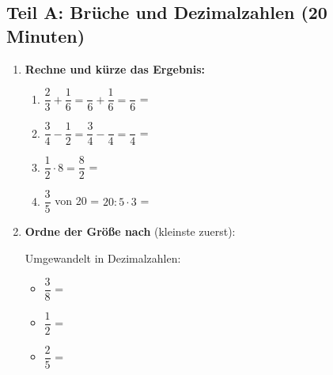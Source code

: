 \subsection*{Teil A: Brüche und Dezimalzahlen (20 Minuten)}

\begin{enumerate}[label=\arabic*.]
    \item \textbf{Rechne und kürze das Ergebnis:}

    \begin{enumerate}[label=\alph*)]
        \item $\dfrac{2}{3} + \dfrac{1}{6} = \dfrac{\phantom{4}}{6} + \dfrac{1}{6} = \dfrac{\phantom{5}}{6}$ = \underline{\hspace{3cm}}

        \item $\dfrac{3}{4} - \dfrac{1}{2} = \dfrac{3}{4} - \dfrac{\phantom{2}}{4} = \dfrac{\phantom{1}}{4}$ = \underline{\hspace{3cm}}

        \item $\dfrac{1}{2} \cdot 8 = \dfrac{8}{2}$ = \underline{\hspace{3cm}}

        \item $\dfrac{3}{5}$ von 20 = $20 : 5 \cdot 3$ = \underline{\hspace{3cm}}
    \end{enumerate}

    \vspace{0.5cm}

    \item \textbf{Ordne der Größe nach} (kleinste zuerst):

    \begin{center}
         \quad {} \quad {} \quad {} \quad {}
    \end{center}

    Umgewandelt in Dezimalzahlen:
    \begin{itemize}
        \item $\dfrac{3}{8}$ = \underline{\hspace{2cm}}
        \item $\dfrac{1}{2}$ = \underline{\hspace{2cm}}
        \item $\dfrac{2}{5}$ = \underline{\hspace{2cm}}
    \end{itemize}


\end{enumerate}
